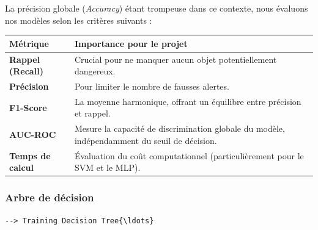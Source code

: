 \documentclass[11pt]{article}
\begin{document}
La précision globale (\emph{Accuracy}) étant trompeuse dans ce contexte,
nous évaluons nos modèles selon les critères suivants :

\begin{longtable}[]{@{}
  >{\raggedright\arraybackslash}p{}
  >{\raggedright\arraybackslash}p{}@{}}
  \toprule\noalign{}
  \begin{minipage}[b]{\linewidth}\raggedright
    Métrique
  \end{minipage} & \begin{minipage}[b]{\linewidth}\raggedright
                     Importance pour le projet
                   \end{minipage}                                     \\
  \midrule\noalign{}
  \endhead
  \bottomrule\noalign{}
  \endlastfoot
  \textbf{Rappel (Recall)}                    & Crucial pour ne manquer aucun objet
  potentiellement dangereux.                                                                      \\
  \textbf{Précision}                          & Pour limiter le nombre de fausses alertes.        \\
  \textbf{F1-Score}                           & La moyenne harmonique, offrant un équilibre entre
  précision et rappel.                                                                            \\
  \textbf{AUC-ROC}                            & Mesure la capacité de discrimination globale du
  modèle, indépendamment du seuil de décision.                                                    \\
  \textbf{Temps de calcul}                    & Évaluation du coût computationnel
  (particulièrement pour le SVM et le MLP).                                                       \\
\end{longtable}

\subsubsection{Arbre de décision}\label{arbre-de-duxe9cision}

\begin{Verbatim}[commandchars=\\\{\}]
  --> Training Decision Tree{\ldots}
\end{Verbatim}
\end{document}
